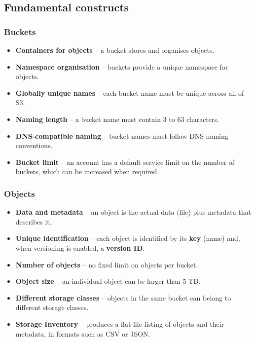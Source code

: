 \documentclass[11pt,a4paper]{article}
\begin{document}
\subsection{Fundamental constructs}



\subsubsection{Buckets}

\begin{itemize}\itemsep2pt
  \item \textbf{Containers for objects} -- a bucket stores and organises objects.
  \item \textbf{Namespace organisation} -- buckets provide a unique namespace for objects.
  \item \textbf{Globally unique names} -- each bucket name must be unique across all of S3.
  \item \textbf{Naming length} -- a bucket name must contain 3 to 63 characters.
  \item \textbf{DNS-compatible naming} -- bucket names must follow DNS naming conventions.
  \item \textbf{Bucket limit} -- an account has a default service limit on the number of
        buckets, which can be increased when required.
\end{itemize}

\subsubsection{Objects}

\begin{itemize}\itemsep2pt
  \item \textbf{Data and metadata} -- an object is the actual data (file) plus metadata that
        describes it.
  \item \textbf{Unique identification} -- each object is identified by its \textbf{key}
        (name) and, when versioning is enabled, a \textbf{version ID}.
  \item \textbf{Number of objects} -- no fixed limit on objects per bucket.
  \item \textbf{Object size} -- an individual object can be larger than 5 TB.
  \item \textbf{Different storage classes} -- objects in the same bucket can belong to
        different storage classes.
  \item \textbf{Storage Inventory} -- produces a flat-file listing of objects and their
        metadata, in formats such as CSV or JSON.
\end{itemize}
\end{document}
